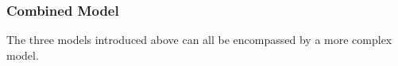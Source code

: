 \documentclass{scrartcl}
\begin{document}

\subsubsection{Combined Model}
The three models introduced above can all be encompassed by a more complex model.
\end{document}

